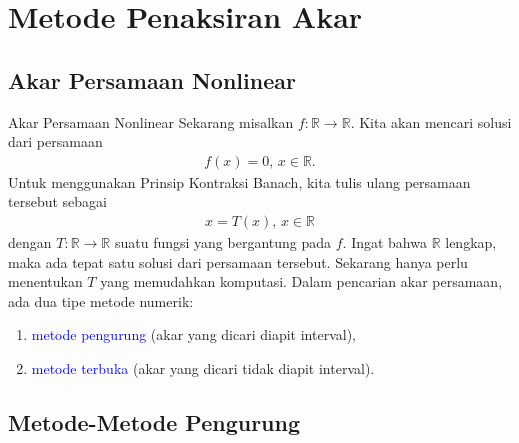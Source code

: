 \documentclass[xcolor={dvipsnames}, 9pt]{beamer}
\renewcommand{\emph}[1]{\textcolor{Blue}{#1}}
\begin{document}
	\section{Metode Penaksiran Akar}
	\subsection{Akar Persamaan Nonlinear}
	\begin{frame}{Akar Persamaan Nonlinear}
		Sekarang misalkan $f:\mathbb{R}\to\mathbb{R}$. Kita akan mencari solusi dari persamaan
		\begin{align*}
			f(x) = 0, \, x\in\mathbb{R}.
		\end{align*}
		Untuk menggunakan Prinsip Kontraksi Banach, kita tulis ulang persamaan tersebut sebagai
		\begin{align}\label{operatorform}
			x=T(x), \, x\in\mathbb{R}
		\end{align}
		dengan $T:\mathbb{R}\to\mathbb{R}$ suatu fungsi yang bergantung pada $f$. Ingat bahwa $\mathbb{R}$ lengkap, maka ada tepat satu solusi dari persamaan tersebut. Sekarang hanya perlu menentukan $T$ yang memudahkan komputasi. \newline
		Dalam pencarian akar persamaan, ada dua tipe metode numerik:
		\begin{enumerate}
			\item \emph{metode pengurung} (akar yang dicari diapit interval),
			\item \emph{metode terbuka} (akar yang dicari tidak diapit interval).
		\end{enumerate} 
	\end{frame}
	\subsection{Metode-Metode Pengurung}
\end{document}
